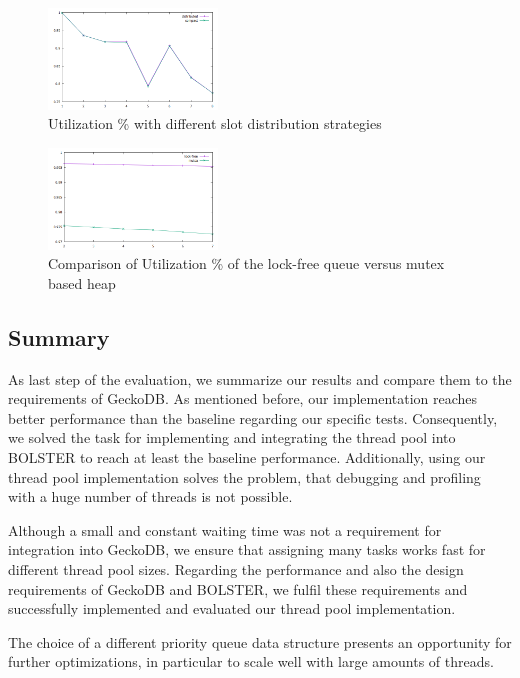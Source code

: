 \documentclass[conference]{IEEEtran}
\begin{document}
\begin{figure}
	\centering\includegraphics[width=0.4\textwidth]{img/slot_distr.png}
	\caption{Utilization \% with different slot distribution strategies}
	\label{fig8}
\end{figure}

\begin{figure}
	\centering\includegraphics[width=0.4\textwidth]{img/lock_free.png}
	\caption{Comparison of Utilization \% of the lock-free queue versus mutex based heap}
	\label{fig9}
\end{figure}

\subsection{Summary}
As last step of the evaluation, we summarize our results and compare them to the requirements of GeckoDB. As mentioned before, our implementation reaches better performance than the baseline regarding our specific tests. Consequently, we solved the task for implementing and integrating the thread pool into BOLSTER to reach at least the baseline performance. Additionally, using our thread pool implementation solves the problem, that debugging and profiling with a huge number of threads is not possible. 

Although a small and constant waiting time was not a requirement for integration into GeckoDB, we ensure that assigning many tasks works fast for different thread pool sizes. Regarding the performance and also the design requirements of GeckoDB and BOLSTER, we fulfil these requirements and successfully implemented and evaluated our thread pool implementation.

The choice of a different priority queue data structure presents an opportunity for further optimizations, in particular to scale well with large amounts of threads.
\end{document}
